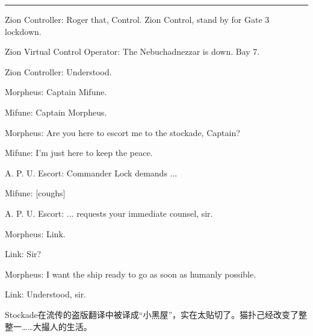 \documentclass{ctexart}
\newcommand{\myparsep}{\noindent \rule[0.5ex]{\linewidth}{1pt}}
\newenvironment{myquote}{\color{green} \setlength{\leftskip}{6em} \setlength{\rightskip}{4em} \setlength{\parindent}{-2em}}{\par}
\begin{document}
\myparsep

\begin{myquote}
Zion Controller: Roger that, Control. Zion Control, stand by for Gate 3 lockdown.

Zion Virtual Control Operator: The Nebuchadnezzar is down. Bay 7.

Zion Controller: Understood.

Morpheus: Captain Mifune.

Mifune: Captain Morpheus.

Morpheus: Are you here to escort me to the stockade, Captain?

Mifune: I'm just here to keep the peace.

A. P. U. Escort: Commander Lock demands ...

Mifune: [coughs]

A. P. U. Escort: ... requests your immediate counsel, sir.

Morpheus: Link.

Link: Sir?

Morpheus: I want the ship ready to go as soon as humanly possible.

Link: Understood, sir.
\end{myquote}

Stockade在流传的盗版翻译中被译成“小黑屋”，实在太贴切了。猫扑己经改变了整整一……大撮人的生活。
\end{document}
